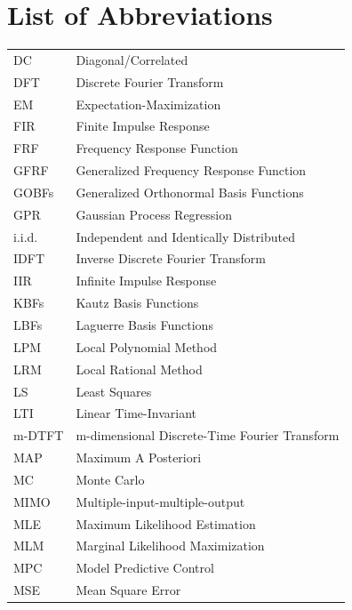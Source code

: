 \documentclass[11pt,twoside]{report}
\begin{document}
\thispagestyle{plain}
\clearpage
{}
{}
\tableofcontents

\cleardoublepage
\thispagestyle{plain}

\chapter*{List of Abbreviations}
\thispagestyle{plain}
\begin{longtable}{p{} p{}}
\\
DC & Diagonal/Correlated \\
DFT & Discrete Fourier Transform \\
EM & Expectation-Maximization \\
FIR & Finite Impulse Response \\
FRF & Frequency Response Function \\
GFRF & Generalized Frequency Response Function \\
GOBFs & Generalized Orthonormal Basis Functions \\
GPR & Gaussian Process Regression \\
i.i.d. & Independent and Identically Distributed \\
IDFT & Inverse Discrete Fourier Transform \\
IIR & Infinite Impulse Response \\
KBFs & Kautz Basis Functions \\
LBFs & Laguerre Basis Functions \\
LPM & Local Polynomial Method \\
LRM & Local Rational Method \\
LS & Least Squares \\
LTI & Linear Time-Invariant \\
m-DTFT & m-dimensional Discrete-Time Fourier Transform \\
MAP & Maximum A Posteriori \\
MC & Monte Carlo \\
MIMO & Multiple-input-multiple-output \\
MLE & Maximum Likelihood Estimation \\
MLM & Marginal Likelihood Maximization \\
MPC & Model Predictive Control \\
MSE & Mean Square Error \\

\end{longtable}
\end{document}
